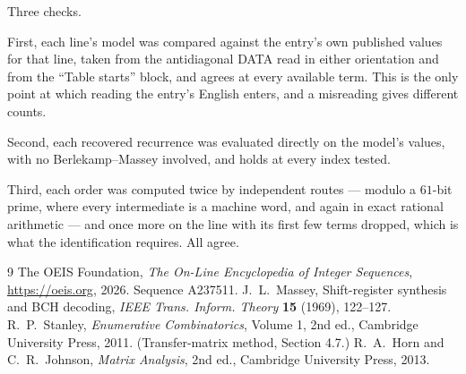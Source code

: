 \documentclass[11pt,a4paper]{article}
\theoremstyle{plain}
\theoremstyle{definition}
\begin{document}
Three checks.

First, each line's model was compared against the entry's own published values for that line,
taken from the antidiagonal DATA read in either orientation and from the ``Table starts''
block, and agrees at every available term. This is the only point at which reading the entry's
English enters, and a misreading gives different counts.

Second, each recovered recurrence was evaluated directly on the model's values, with no
Berlekamp--Massey involved, and holds at every index tested.

Third, each order was computed twice by independent routes --- modulo a $61$-bit prime, where
every intermediate is a machine word, and again in exact rational arithmetic --- and once more
on the line with its first few terms dropped, which is what the identification requires. All
agree.

\begin{thebibliography}{9}
 The OEIS Foundation, \emph{The On-Line Encyclopedia of Integer
Sequences}, \url{https://oeis.org}, 2026. Sequence A237511.
 J.~L.~Massey, Shift-register synthesis and BCH decoding, \emph{IEEE
Trans. Inform. Theory} \textbf{15} (1969), 122--127.
 R.~P.~Stanley, \emph{Enumerative Combinatorics}, Volume 1, 2nd ed.,
Cambridge University Press, 2011. (Transfer-matrix method, Section 4.7.)
 R.~A.~Horn and C.~R.~Johnson, \emph{Matrix Analysis}, 2nd ed., Cambridge
University Press, 2013.
\end{thebibliography}
\end{document}
